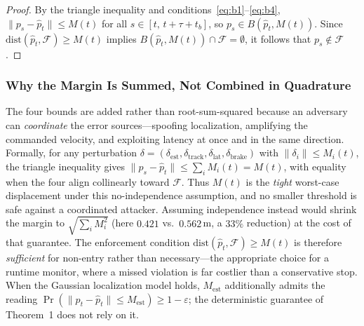 \documentclass[conference]{IEEEtran}
\begin{document}
\begin{proof}
By the triangle inequality and conditions~\eqref{eq:b1}--\eqref{eq:b4}, $\|p_s - \hat{p}_t\| \le M(t)$ for all $s \in [t,\, t{+}\tau{+}t_b]$, so $p_s \in B(\hat{p}_t, M(t))$. Since $\mathrm{dist}(\hat{p}_t, \mathcal{F}) \ge M(t)$ implies $B(\hat{p}_t, M(t)) \cap \mathcal{F} = \emptyset$, it follows that $p_s \notin \mathcal{F}$.
\end{proof}

\subsubsection{Why the Margin Is Summed, Not Combined in Quadrature}\label{sec:adversarial}
The four bounds are added rather than root-sum-squared because an adversary can \emph{coordinate} the error sources---spoofing localization, amplifying the commanded velocity, and exploiting latency at once and in the same direction. Formally, for any perturbation $\delta=(\delta_{\mathrm{est}},\delta_{\mathrm{track}},\delta_{\mathrm{lat}},\delta_{\mathrm{brake}})$ with $\|\delta_i\|\le M_i(t)$, the triangle inequality gives $\|p_s-\hat p_t\|\le\sum_i M_i(t)=M(t)$, with equality when the four align collinearly toward $\mathcal{F}$. Thus $M(t)$ is the \emph{tight} worst-case displacement under this no-independence assumption, and no smaller threshold is safe against a coordinated attacker. Assuming independence instead would shrink the margin to $\sqrt{\sum_i M_i^2}$ (here $0.421$ vs.\ $0.562$\,m, a $33\%$ reduction) at the cost of that guarantee. The enforcement condition $\mathrm{dist}(\hat p_t,\mathcal F)\ge M(t)$ is therefore \emph{sufficient} for non-entry rather than necessary---the appropriate choice for a runtime monitor, where a missed violation is far costlier than a conservative stop. When the Gaussian localization model holds, $M_{\mathrm{est}}$ additionally admits the reading $\Pr(\|p_t-\hat p_t\|\le M_{\mathrm{est}})\ge 1-\varepsilon$; the deterministic guarantee of Theorem~1 does not rely on it.
\end{document}
